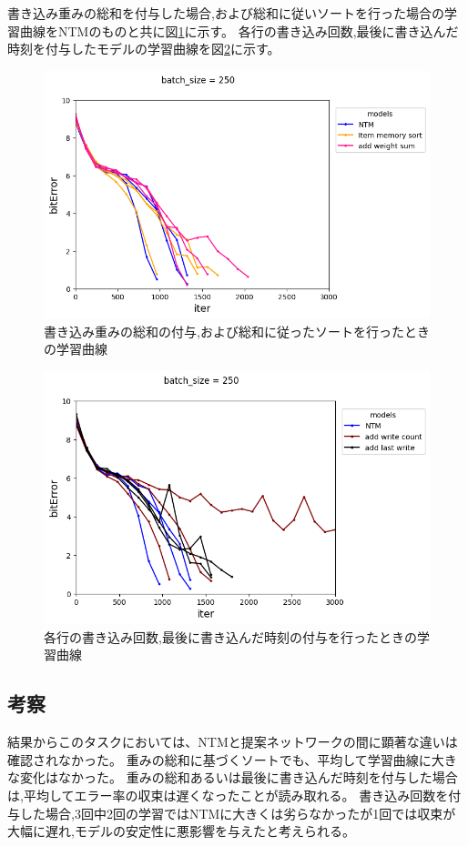 書き込み重みの総和を付与した場合,および総和に従いソートを行った場合の学習曲線をNTMのものと共に図\ref{fig:ntm,sort,supple1}に示す。
各行の書き込み回数,最後に書き込んだ時刻を付与したモデルの学習曲線を図\ref{fig:ntm,supple2,3}に示す。
\begin{figure}[t]
	\centering
	\includegraphics[width=\linewidth]{./figure/associative/ntm,sort,supple1_m12.png}
	\caption{書き込み重みの総和の付与,および総和に従ったソートを行ったときの学習曲線}
	\label{fig:ntm,sort,supple1}
\end{figure}
\begin{figure}[t]
	\centering
	\includegraphics[width=\linewidth]{./figure/associative/ntm,supple2,3_m12.png}
	\caption{各行の書き込み回数,最後に書き込んだ時刻の付与を行ったときの学習曲線}
	\label{fig:ntm,supple2,3}
\end{figure}

\subsection{考察}
結果からこのタスクにおいては、NTMと提案ネットワークの間に顕著な違いは確認されなかった。
重みの総和に基づくソートでも、平均して学習曲線に大きな変化はなかった。
重みの総和あるいは最後に書き込んだ時刻を付与した場合は,平均してエラー率の収束は遅くなったことが読み取れる。
書き込み回数を付与した場合,3回中2回の学習ではNTMに大きくは劣らなかったが1回では収束が大幅に遅れ,モデルの安定性に悪影響を与えたと考えられる。

